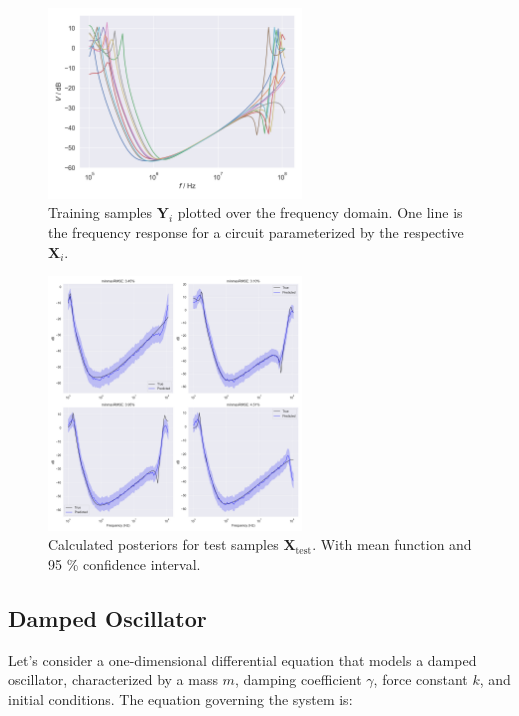 \documentclass{article}
\begin{document}
\begin{figure}[htbp!]
    \centering
    \includegraphics[width=0.6\textwidth]{plots/data_samples.png}
    \caption{Training samples $\bm Y_i$ plotted over the frequency domain. One line is the frequency response for a circuit parameterized by the respective $\bm X_i$.}
    \label{fig:training_samples}
\end{figure}
\begin{figure}[htbp!]
    \centering
    \includegraphics[width=0.6\textwidth]{plots/prediction_transformer.png}
    \caption{Calculated posteriors for test samples $\bm X_\text{test}$. With mean function and 95 \% confidence interval.}
    \label{fig:training_samples}
\end{figure}
\subsection{Damped Oscillator}
Let's consider a one-dimensional differential equation that models a damped oscillator, characterized by a mass $ m $, damping coefficient $ \gamma $, force constant $k$, and initial conditions. The equation governing the system is:
\end{document}
